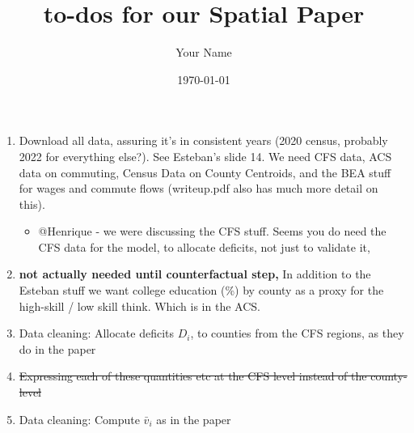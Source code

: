 \documentclass{article}
\title{to-dos for our Spatial Paper}
\author{Your Name}
\date{\today}
\begin{document}
\maketitle
\begin{enumerate}
    \item Download all data, assuring it's in consistent years (2020 census, probably 2022 for everything else?). See Esteban's slide 14. We need CFS data, ACS data on commuting, Census Data on County Centroids, and the BEA stuff for wages and commute flows (writeup.pdf also has much more detail on this).
    
    \begin{itemize}
        \item @Henrique - we were discussing the CFS stuff. Seems you do need the CFS data for the model, to allocate deficits, not just to validate it, 
    \end{itemize}
    \item \textbf{not actually needed until counterfactual step,} In addition to the Esteban stuff we want college education (\%) by county as a proxy for the high-skill / low skill think. Which is in the ACS. 
    \item Data cleaning: Allocate deficits $D_i$, to counties from the CFS regions, as they do in the paper
    \item \st{Expressing each of these quantities etc at the CFS level instead of the county-level}
    \item Data cleaning: Compute $\bar v_i$ as in the paper 
    

\end{enumerate}
\end{document}

